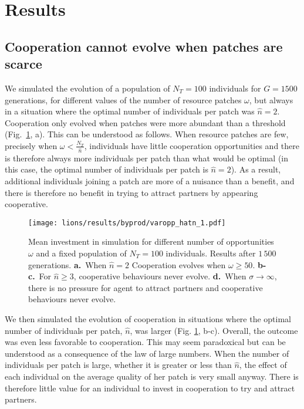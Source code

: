 \section{Results}

\subsection{Cooperation cannot evolve when patches are scarce}

We simulated the evolution of a population of $N_T=100$ individuals for $G=1500$ generations, for different values of the number of resource patches $\omega$, but always in a situation where the optimal number of individuals per patch was $\hat{n}=2$. Cooperation only evolved when patches were more abundant than a threshold (Fig.~\ref{fig:varyingopp}, a). This can be understood as follows. When resource patches are few, precisely when $\omega < \frac{N_T}{\hat{n}}$, individuals have little cooperation opportunities and there is therefore always more individuals per patch than what would be optimal (in this case, the optimal number of individuals per patch is $\hat{n}=2$). As a result, additional individuals joining a patch are more of a nuisance than a benefit, and there is therefore no benefit in trying to attract partners by appearing cooperative.

\begin{figure}[tb]
    \centering
    \texttt{[image: lions/results/byprod/varopp\_hatn\_1.pdf]}
    \caption{Mean investment in simulation for different number of opportunities $\omega$ and a fixed population of $N_T=100$ individuals. Results after $1\,500$ generations. \textbf{a.}~When $\hat{n} = 2$ Cooperation evolves when $\omega \geq 50$. \textbf{b-c.}~For $\hat{n} \geq 3$, cooperative behaviours never evolve. \textbf{d.}~When $\sigma \to \infty$, there is no pressure for agent to attract partners and cooperative behaviours never evolve.}

    \label{fig:varyingopp}
\end{figure}


We then simulated the evolution of cooperation in situations where the optimal number of individuals per patch, $\hat{n}$, was larger (Fig. \ref{fig:varyingopp}, b-c). Overall, the outcome was even less favorable to cooperation. This may seem paradoxical but can be understood as a consequence of the law of large numbers. When the number of individuals per patch is large, whether it is greater or less than $\hat{n}$, the effect of each individual on the average quality of her patch is very small anyway. There is therefore little value for an individual to invest in cooperation to try and attract partners.


